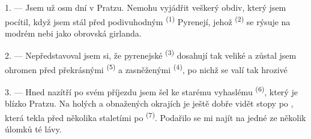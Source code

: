 %
%
%

\VUsaut{4.0mm}
\VUsaut{3.0mm}

\VUsaut{3.0mm}

\VUsaut{3.0mm}

1. --- Jsem už osm dní v Pratzu. Nemohu vyjádřit veškerý obdiv, který jsem pocítil, když jsem
stál před podivuhodným  \textsuperscript{(1)} Pyrenejí, jehož 
\textsuperscript{(2)} se rýsuje na modrém nebi jako obrovská girlanda.

2. --- Nepředstavoval jsem si, že pyrenejské  \textsuperscript{(3)} dosahují
tak veliké  a zůstal jsem ohromen před překrásnými
 \textsuperscript{(5)} a zasněženými 
\textsuperscript{(4)}, po nichž se valí tak hrozivé 

\VUsaut{3.0mm}
\VUsaut{3.0mm}

3. --- Hned nazítří po svém příjezdu jsem šel ke starému vyhaslému 
\textsuperscript{(6)}, který je blízko Pratzu. Na holých a obnažených okrajích
 je ještě dobře vidět stopy po , která tekla před několika
staletími po  \textsuperscript{(7)}. Podařilo se mi najít na jedné ze
 několik úlomků té lávy.

